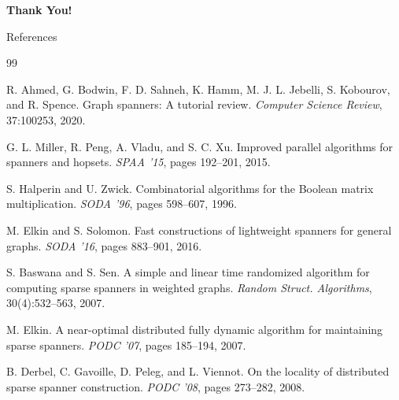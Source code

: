 \documentclass{beamer}
\begin{document}
\begin{frame}
    \begin{center}
        \Huge \textbf{Thank You!}
    \end{center}
\end{frame}


\begin{frame}[allowframebreaks]{References}
    \small
    \begin{thebibliography}{99}
        
        R. Ahmed, G. Bodwin, F. D. Sahneh, K. Hamm, M. J. L. Jebelli, S. Kobourov, and R. Spence.
        \newblock Graph spanners: A tutorial review.
        \newblock \emph{Computer Science Review}, 37:100253, 2020.
        
        G. L. Miller, R. Peng, A. Vladu, and S. C. Xu.
        \newblock Improved parallel algorithms for spanners and hopsets.
        \newblock \emph{SPAA '15}, pages 192--201, 2015.

        S. Halperin and U. Zwick.
        \newblock Combinatorial algorithms for the Boolean matrix multiplication.
        \newblock \emph{SODA '96}, pages 598--607, 1996.

        M. Elkin and S. Solomon.
        \newblock Fast constructions of lightweight spanners for general graphs.
        \newblock \emph{SODA '16}, pages 883--901, 2016.

        S. Baswana and S. Sen.
        \newblock A simple and linear time randomized algorithm for computing sparse spanners in weighted graphs.
        \newblock \emph{Random Struct. Algorithms}, 30(4):532--563, 2007.

        M. Elkin.
        \newblock A near-optimal distributed fully dynamic algorithm for maintaining sparse spanners.
        \newblock \emph{PODC '07}, pages 185--194, 2007.

        B. Derbel, C. Gavoille, D. Peleg, and L. Viennot.
        \newblock On the locality of distributed sparse spanner construction.
        \newblock \emph{PODC '08}, pages 273--282, 2008.

    \end{thebibliography}
\end{frame}
\end{document}
